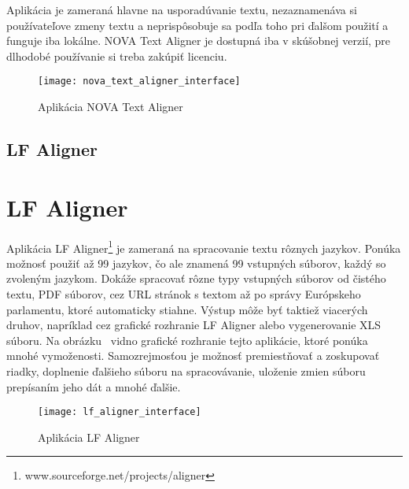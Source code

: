 Aplikácia je zameraná hlavne na usporadúvanie textu, nezaznamenáva si používateľove zmeny textu a neprispôsobuje sa podľa toho pri ďalšom použití a funguje iba lokálne. NOVA Text Aligner je dostupná iba v skúšobnej verzií, pre dlhodobé používanie si treba zakúpiť licenciu.

\begin{figure}[H]
	\begin{center}\texttt{[image: nova\_text\_aligner\_interface]}\end{center}
	\caption[Aplikácia NOVA Text Aligner]{Aplikácia NOVA Text Aligner\footnotemark}\label{fig:nova_text_aligner_interface}
\end{figure}

%
%
{
	\subsection{LF Aligner}
}
{
	\section{LF Aligner}
}
Aplikácia LF Aligner\footnote{www.sourceforge.net/projects/aligner} je zameraná na spracovanie textu rôznych jazykov. Ponúka možnosť použiť až 99 jazykov, čo ale znamená 99 vstupných súborov, každý so zvoleným jazykom. Dokáže spracovať rôzne typy vstupných súborov od čistého textu, PDF súborov, cez URL stránok s textom až po správy Európskeho parlamentu, ktoré automaticky stiahne. Výstup môže byť taktiež viacerých druhov, napríklad cez grafické rozhranie LF Aligner alebo vygenerovanie XLS súboru. Na obrázku~ vidno grafické rozhranie tejto aplikácie, ktoré ponúka mnohé vymoženosti. Samozrejmosťou je možnosť premiestňovať a zoskupovať riadky, doplnenie ďalšieho súboru na spracovávanie, uloženie zmien súboru prepísaním jeho dát a mnohé ďalšie.

\begin{figure}[H]
	\begin{center}\texttt{[image: lf\_aligner\_interface]}\end{center}
	\caption[Aplikácia LF Aligner]{Aplikácia LF Aligner}\label{fig:lf_aligner_interface}
\end{figure}

